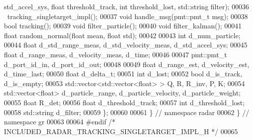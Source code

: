 \begin{DoxyCode}
      std\_accel\_sys, \textcolor{keywordtype}{float} threshold\_track, \textcolor{keywordtype}{int} threshold\_lost, std::string filter);
00036       ~tracking_singletarget_impl();
00037       \textcolor{keywordtype}{void} handle_msg(pmt::pmt\_t msg);
00038       \textcolor{keywordtype}{bool} tracking();
00039       \textcolor{keywordtype}{void} filter_particle();
00040       \textcolor{keywordtype}{void} filter_kalman();
00041       \textcolor{keywordtype}{float} random_normal(\textcolor{keywordtype}{float} mean, \textcolor{keywordtype}{float} std);
00042       
00043       \textcolor{keywordtype}{int} d_num_particle;
00044       \textcolor{keywordtype}{float} d_std_range_meas, d_std_velocity_meas, d_std_accel_sys;
00045       \textcolor{keywordtype}{float} d_range_meas, d_velocity_meas, d_time;
00046       
00047       pmt::pmt\_t d_port_id_in, d_port_id_out;
00048       
00049       \textcolor{keywordtype}{float} d_range_est, d_velocity_est, d_time_last;
00050       \textcolor{keywordtype}{float} d_delta_t;
00051       \textcolor{keywordtype}{int} d_lost;
00052       \textcolor{keywordtype}{bool} d_is_track, d_is_empty;
00053       std::vector<std::vector<float> > Q, R, R_inv, P, K;
00054       std::vector<float> d_particle_range, d_particle_velocity, 
      d_particle_weight;
00055       \textcolor{keywordtype}{float} R_det;
00056       \textcolor{keywordtype}{float} d_threshold_track;
00057       \textcolor{keywordtype}{int} d_threshold_lost;
00058       std::string d_filter;
00059     \};
00060 
00061   \} \textcolor{comment}{// namespace radar}
00062 \} \textcolor{comment}{// namespace gr}
00063 
00064 \textcolor{preprocessor}{#endif }\textcolor{comment}{/* INCLUDED\_RADAR\_TRACKING\_SINGLETARGET\_IMPL\_H */}\textcolor{preprocessor}{}
00065 
\end{DoxyCode}
